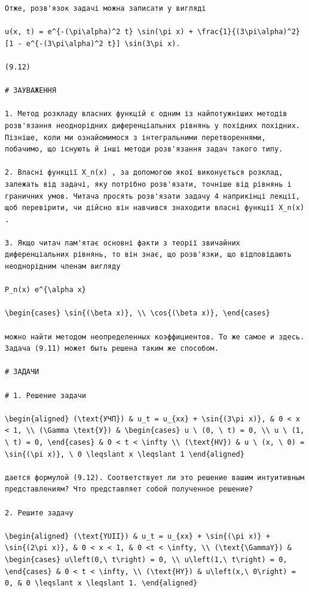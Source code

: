 \documentclass[
  ukrainian,
]{article}
\begin{document}
\begin{verbatim}
Отже, розв'язок задачі можна записати у вигляді

u(x, t) = e^{-(\pi\alpha)^2 t} \sin(\pi x) + \frac{1}{(3\pi\alpha)^2} [1 - e^{-(3\pi\alpha)^2 t}] \sin(3\pi x).

(9.12)

# ЗАУВАЖЕННЯ

1. Метод розкладу власних функцій є одним із найпотужніших методів розв'язання неоднорідних диференціальних рівнянь у похідних похідних. Пізніше, коли ми ознайомимося з інтегральними перетвореннями, побачимо, що існують й інші методи розв'язання задач такого типу.

2. Власні функції X_n(x) , за допомогою якої виконується розклад, залежать від задачі, яку потрібно розв'язати, точніше від рівнянь і граничних умов. Читача просять розв'язати задачу 4 наприкінці лекції, щоб перевірити, чи дійсно він навчився знаходити власні функції X_n(x) .

3. Якщо читач пам'ятає основні факти з теорії звичайних диференціальних рівнянь, то він знає, що розв'язки, що відповідають неоднорідним членам вигляду

P_n(x) e^{\alpha x}

\begin{cases} \sin{(\beta x)}, \\ \cos{(\beta x)}, \end{cases}

можно найти методом неопределенных коэффициентов. То же самое и здесь. Задача (9.11) может быть решена таким же способом.

# ЗАДАЧИ

# 1. Решение задачи

\begin{aligned} (\text{УЧП}) & u_t = u_{xx} + \sin{(3\pi x)}, & 0 < x < 1, \\ (\Gamma \text{У}) & \begin{cases} u \ (0, \ t) = 0, \\ u \ (1, \ t) = 0, \end{cases} & 0 < t < \infty \\ (\text{HV}) & u \ (x, \ 0) = \sin{(\pi x)}, \ 0 \leqslant x \leqslant 1 \end{aligned}

дается формулой (9.12). Соответствует ли это решение вашим интуитивным представлениям? Что представляет собой полученное решение?

2. Решите задачу

\begin{aligned} (\text{YUII}) & u_t = u_{xx} + \sin{(\pi x)} + \sin{(2\pi x)}, & 0 < x < 1, & 0 <t < \infty, \\ (\text{\GammaY}) & \begin{cases} u\left(0,\ t\right) = 0, \\ u\left(1,\ t\right) = 0, \end{cases} & 0 < t < \infty, \\ (\text{HY}) & u\left(x,\ 0\right) = 0, & 0 \leqslant x \leqslant 1. \end{aligned}


\end{verbatim}
\end{document}
